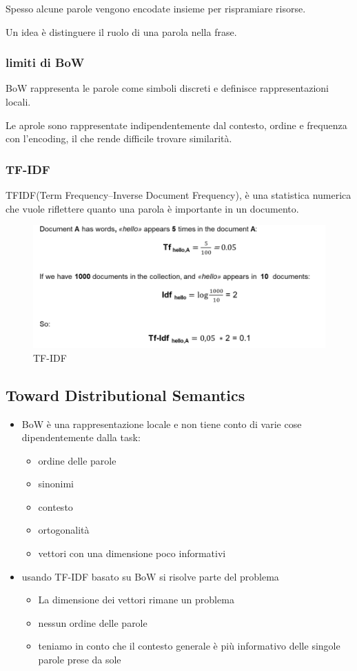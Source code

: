 Spesso alcune parole vengono encodate insieme per rispramiare risorse.

Un idea è distinguere il ruolo di una parola nella frase.


\subsubsection{limiti di BoW}
BoW rappresenta le parole come simboli discreti e definisce rappresentazioni locali.

Le aprole sono rappresentate indipendentemente dal contesto, ordine e frequenza con
l'encoding, il che rende difficile trovare similarità.

\subsubsection{TF-IDF}
TFIDF(Term Frequency–Inverse Document Frequency), è una statistica
numerica che vuole riflettere quanto una parola è importante in un documento.


\begin{figure}[H]
    \centering
    \includegraphics[width=0.7\linewidth]{imgs/tf-idf}
    \caption{TF-IDF}
    \label{fig:TF-IDF}
\end{figure}


\subsection{Toward Distributional Semantics}
\begin{itemize}
    \item BoW è una rappresentazione locale e non tiene conto di varie cose dipendentemente dalla task:
    \begin{itemize}
        \item ordine delle parole
        \item sinonimi
        \item contesto
        \item ortogonalità
        \item vettori con una dimensione poco informativi
    \end{itemize}
    \item usando TF-IDF basato su BoW si risolve parte del problema
    \begin{itemize}
        \item La dimensione dei vettori rimane un problema
        \item nessun ordine delle parole
        \item teniamo in conto che il contesto generale è più informativo delle 
        singole parole prese da sole
    \end{itemize}
\end{itemize}

